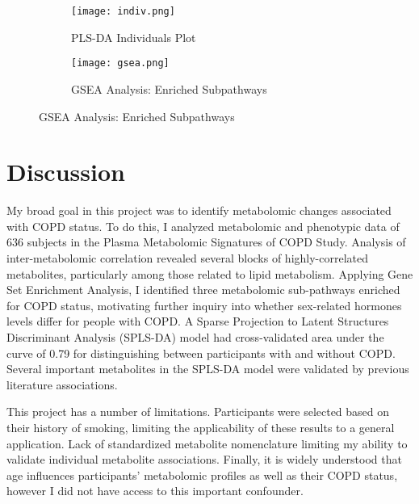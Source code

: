 \documentclass{article}
\begin{document}


\begin{figure}
  \begin{subfigure}[b]{0.45\textwidth}
  \caption{PLS-DA Individuals Plot}
  \texttt{[image: indiv.png]}
  \label{fig:indiv}
  \end{subfigure}
\begin{subfigure}[b]{0.45\textwidth}
  \caption{GSEA Analysis: Enriched Subpathways}
  \texttt{[image: gsea.png]}
  \label{fig:gsea}
  \end{subfigure}
  \end{figure}


\section*{Discussion}
My broad goal in this project was to identify metabolomic changes associated with COPD status. To do this, I analyzed metabolomic and phenotypic data of 636 subjects in the Plasma Metabolomic Signatures of COPD Study. Analysis of inter-metabolomic correlation revealed several blocks of highly-correlated metabolites, particularly among those related to lipid metabolism. Applying Gene Set Enrichment Analysis, I identified three metabolomic sub-pathways enriched for COPD status, motivating further inquiry into whether sex-related hormones levels differ for people with COPD. A Sparse Projection to Latent Structures Discriminant Analysis (SPLS-DA) model had cross-validated area under the curve of 0.79 for distinguishing between participants with and without COPD. Several important metabolites in the SPLS-DA model were validated by previous literature associations.

This project has a number of limitations. Participants were selected based on their history of smoking, limiting the applicability of these results to a general application. Lack of standardized metabolite nomenclature limiting my ability to validate individual metabolite associations. Finally, it is widely understood that age influences participants' metabolomic profiles as well as their COPD status, however I did not have access to this important confounder.




\end{document}
